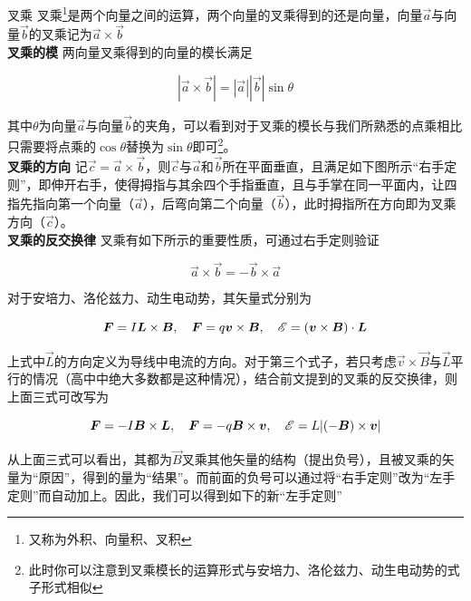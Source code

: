 \begin{defi}[label=d_cc]{叉乘}{}
叉乘\footnote{又称为外积、向量积、叉积}是两个向量之间的运算，两个向量的叉乘得到的还是向量，向量$\vec{a}$与向量$\vec{b}$的叉乘记为$\vec{a} \times \vec{b}$
~\\

\textbf{叉乘的模}  \quad 两向量叉乘得到的向量的模长满足

$$ | \vec{a} \times \vec{b} | = | \vec{a} | | \vec{b} | \sin \theta$$

其中$\theta$为向量$\vec{a}$与向量$\vec{b}$的夹角，可以看到对于叉乘的模长与我们所熟悉的点乘相比只需要将点乘的$\cos \theta$替换为$\sin \theta$即可\footnote{此时你可以注意到叉乘模长的运算形式与安培力、洛伦兹力、动生电动势的式子形式相似}。
~\\

\textbf{叉乘的方向} \quad 记$\vec{c} = \vec{a} \times \vec{b}$，则$\vec{c}$与$\vec{a}$和$\vec{b}$所在平面垂直，且满足如下图所示“右手定则”，即伸开右手，使得拇指与其余四个手指垂直，且与手掌在同一平面内，让四指先指向第一个向量（$\vec{a}$），后弯向第二个向量（$\vec{b}$），此时拇指所在方向即为叉乘方向（$\vec{c}$）。
~\\

\textbf{叉乘的反交换律} \quad 叉乘有如下所示的重要性质，可通过右手定则验证

$$\vec{a} \times \vec{b} = - \vec{b} \times \vec{a}$$

\end{defi}

对于安培力、洛伦兹力、动生电动势，其矢量式分别为

$$\boldsymbol{F} = I \boldsymbol{L} \times \boldsymbol{B}, \quad \boldsymbol{F} = q \boldsymbol{v} \times \boldsymbol{B}, \quad \mathscr{E} = (\boldsymbol{v} \times \boldsymbol{B}) \cdot \boldsymbol{L}$$

上式中$\vec{L}$的方向定义为导线中电流的方向。对于第三个式子，若只考虑$\vec{v} \times \vec{B}$与$\vec{L}$平行的情况（高中中绝大多数都是这种情况），结合前文提到的叉乘的反交换律，则上面三式可改写为

$$\boldsymbol{F} = - I \boldsymbol{B} \times \boldsymbol{L}, \quad \boldsymbol{F} = - q \boldsymbol{B} \times \boldsymbol{v}, \quad \mathscr{E} = L | (- \boldsymbol{B}) \times \boldsymbol{v} |$$

从上面三式可以看出，其都为$\vec{B}$叉乘其他矢量的结构（提出负号），且被叉乘的矢量为“原因”，得到的量为“结果”。而前面的负号可以通过将“右手定则”改为“左手定则”而自动加上。因此，我们可以得到如下的新“左手定则”


